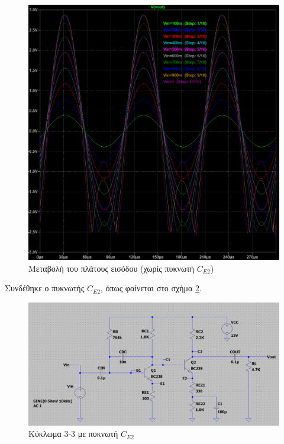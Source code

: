 \documentclass[11pt,a4paper,twoside,onecolumn,openright,final]{memoir}
\begin{document}
\begin{figure}[H]
\centerfloat%
\includegraphics[width=12.0cm]{figures/exercise3_1apokopi.png}
\caption{Μεταβολή του πλάτους εισόδου (χωρίς πυκνωτή \(C_{E2}\))}\label{fig:ex3plot4}
\end{figure}

Συνδέθηκε ο πυκνωτής \(C_{E2}\), όπως φαίνεται στο σχήμα \ref{fig:ex3circuit2}.
\begin{figure}[H]
\centerfloat%
\includegraphics[width=12.0cm]{figures/exercise3circuit2.png}
\caption{Κύκλωμα 3-3 με πυκνωτή \(C_{E2}\)}\label{fig:ex3circuit2}
\end{figure}
\end{document}
